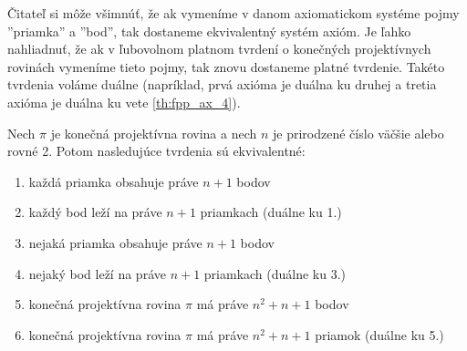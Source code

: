 Čitateľ si môže všimnúť, že ak vymeníme v danom axiomatickom systéme pojmy ''priamka'' a ''bod'', tak dostaneme ekvivalentný systém axióm. 
Je ľahko nahliadnuť, že ak v ľubovolnom platnom tvrdení o konečných projektívnych rovinách vymeníme tieto pojmy, tak znovu dostaneme platné tvrdenie.
Takéto tvrdenia voláme duálne (napríklad, prvá axióma je duálna ku druhej a tretia axióma
je duálna ku vete \ref{th:fpp_ax_4}).


\begin{theorem}
\label{th:fpp_props}
Nech $\pi$ je konečná projektívna rovina 
a nech $n$ je prirodzené 
číslo väčšie alebo rovné 2. 
Potom nasledujúce tvrdenia sú ekvivalentné:
\begin{enumerate}
    \item každá priamka obsahuje práve $n+1$ bodov
    \item každý bod leží na práve $n+1$ priamkach (duálne ku 1.)
    \item nejaká priamka obsahuje práve $n+1$ bodov
    \item nejaký bod leží na práve $n+1$ priamkach (duálne ku 3.)
    \item konečná projektívna rovina $\pi$ má práve $n^2+n+1$ bodov 
    \item konečná projektívna rovina $\pi$ má práve $n^2+n+1$ priamok (duálne ku 5.)
\end{enumerate}
\end{theorem}

